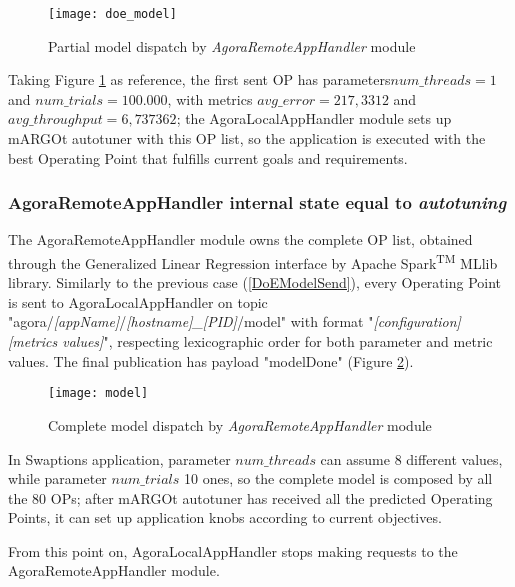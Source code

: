 \begin{figure}[hb]

    \centering
    \texttt{[image: doe\_model]}
    \caption{Partial model dispatch by \textit{AgoraRemoteAppHandler} module}
    \label{fig:doe_model}
    
\end{figure}

Taking Figure \ref{fig:doe_model} as reference, the first sent OP has parameters\linebreak $num\_threads = 1$ and $num\_trials = 100.000$, with metrics $avg\_error = 217,3312$ and $avg\_throughput = 6,737362$; the AgoraLocalAppHandler module sets up mARGOt autotuner with this OP list, so the application is executed with the best Operating Point that fulfills current goals and requirements.


\subsubsection{AgoraRemoteAppHandler internal state equal to \textit{autotuning}}\label{modelSend}

The AgoraRemoteAppHandler module owns the complete OP list, obtained through the Generalized Linear Regression interface by A\-pach\-e Spark\textsuperscript{TM} MLlib library. Similarly to the previous case (\ref{DoEModelSend}), every Operating Point is sent to AgoraLocalAppHandler on topic "agora\slash{}\textit{[app\-Name]}\slash{}\textit{[host\-name]\_[PID]}\slash{}model" with format "\textit{[configuration] [metrics values]}", respecting lexicographic order for both parameter and metric values. The final publication has payload "modelDone" (Figure \ref{fig:model}).

\begin{figure}[hb]

    \centering
    \texttt{[image: model]}
    \caption{Complete model dispatch by \textit{AgoraRemoteAppHandler} module}
    \label{fig:model}
    
\end{figure}

In Swaptions application, parameter $num\_threads$ can assume 8 different values, while parameter $num\_trials$ 10 ones, so the complete model is composed by all the 80 OPs; after mARGOt autotuner has received all the predicted Operating Points, it can set up application knobs according to current objectives.

From this point on, AgoraLocalAppHandler stops making requests to the AgoraRemoteAppHandler module.






